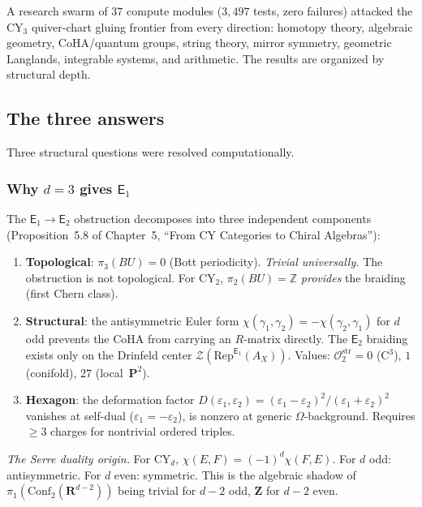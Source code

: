 \documentclass[11pt]{article}
\newcommand{\Z}{\mathbb{Z}}
\newcommand{\Eone}{\mathsf{E}_1}
\newcommand{\Etwo}{\mathsf{E}_2}
\begin{document}
A research swarm of $37$ compute modules ($3{,}497$ tests, zero failures) attacked the CY$_3$ quiver-chart gluing frontier from every direction: homotopy theory, algebraic geometry, CoHA/quantum groups, string theory, mirror symmetry, geometric Langlands, integrable systems, and arithmetic. The results are organized by structural depth.

\subsection{The three answers}

Three structural questions were resolved computationally.

\subsubsection{Why $d = 3$ gives $\Eone$}

The $\Eone \to \Etwo$ obstruction decomposes into three independent components (Proposition~5.8 of Chapter~5, ``From CY Categories to Chiral Algebras''):
\begin{enumerate}[label=(\roman*)]
 \item \textbf{Topological}: $\pi_3(BU) = 0$ (Bott periodicity). \emph{Trivial universally.} The obstruction is not topological. For CY$_2$, $\pi_2(BU) = \Z$ \emph{provides} the braiding (first Chern class).
 \item \textbf{Structural}: the antisymmetric Euler form $\chi(\gamma_1, \gamma_2) = -\chi(\gamma_2, \gamma_1)$ for $d$ odd prevents the CoHA from carrying an $R$-matrix directly. The $\Etwo$ braiding exists only on the Drinfeld center $\mathcal{Z}(\mathrm{Rep}^{\Eone}(A_X))$. Values: $\mathcal{O}_2^{\mathrm{str}} = 0$ (C$^3$), $1$ (conifold), $27$ (local~$\mathbf{P}^2$).
 \item \textbf{Hexagon}: the deformation factor $D(\varepsilon_1, \varepsilon_2) = (\varepsilon_1 - \varepsilon_2)^2/(\varepsilon_1 + \varepsilon_2)^2$ vanishes at self-dual ($\varepsilon_1 = -\varepsilon_2$), is nonzero at generic $\Omega$-background. Requires $\geq 3$ charges for nontrivial ordered triples.
\end{enumerate}

\noindent\textit{The Serre duality origin.} For CY$_d$, $\chi(E,F) = (-1)^d \chi(F,E)$. For $d$ odd: antisymmetric. For $d$ even: symmetric. This is the algebraic shadow of $\pi_1(\mathrm{Conf}_2(\mathbf{R}^{d-2}))$ being trivial for $d-2$ odd, $\mathbf{Z}$ for $d-2$ even.
\end{document}
